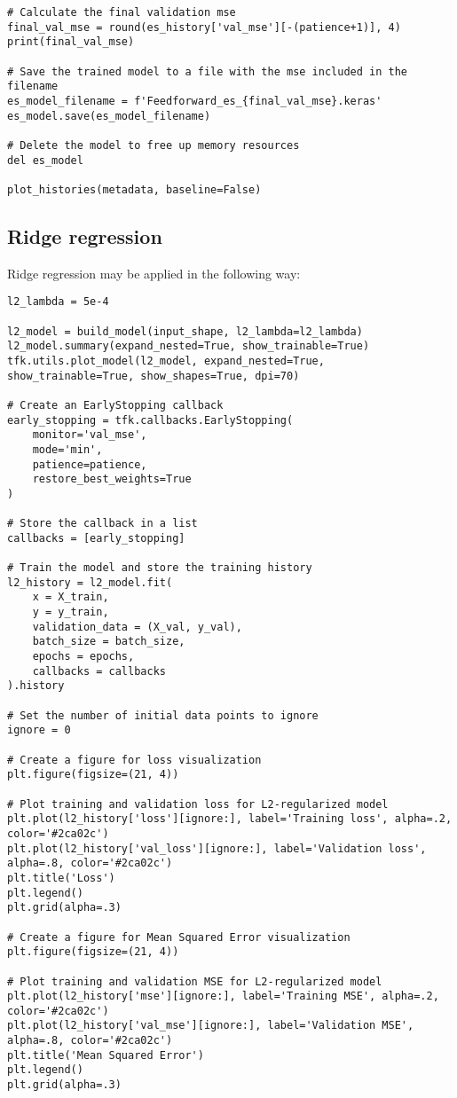 \begin{lstlisting}[style=Python]
# Calculate the final validation mse
final_val_mse = round(es_history['val_mse'][-(patience+1)], 4)
print(final_val_mse)

# Save the trained model to a file with the mse included in the filename
es_model_filename = f'Feedforward_es_{final_val_mse}.keras'
es_model.save(es_model_filename)

# Delete the model to free up memory resources
del es_model

plot_histories(metadata, baseline=False)
\end{lstlisting}

\subsection{Ridge regression}
Ridge regression may be applied in the following way: 
\begin{lstlisting}[style=Python]
l2_lambda = 5e-4

l2_model = build_model(input_shape, l2_lambda=l2_lambda)
l2_model.summary(expand_nested=True, show_trainable=True)
tfk.utils.plot_model(l2_model, expand_nested=True, show_trainable=True, show_shapes=True, dpi=70)

# Create an EarlyStopping callback
early_stopping = tfk.callbacks.EarlyStopping(
    monitor='val_mse',
    mode='min',
    patience=patience,
    restore_best_weights=True
)

# Store the callback in a list
callbacks = [early_stopping]

# Train the model and store the training history
l2_history = l2_model.fit(
    x = X_train,
    y = y_train,
    validation_data = (X_val, y_val),
    batch_size = batch_size,
    epochs = epochs,
    callbacks = callbacks
).history

# Set the number of initial data points to ignore
ignore = 0

# Create a figure for loss visualization
plt.figure(figsize=(21, 4))

# Plot training and validation loss for L2-regularized model
plt.plot(l2_history['loss'][ignore:], label='Training loss', alpha=.2, color='#2ca02c')
plt.plot(l2_history['val_loss'][ignore:], label='Validation loss', alpha=.8, color='#2ca02c')
plt.title('Loss')
plt.legend()
plt.grid(alpha=.3)

# Create a figure for Mean Squared Error visualization
plt.figure(figsize=(21, 4))

# Plot training and validation MSE for L2-regularized model
plt.plot(l2_history['mse'][ignore:], label='Training MSE', alpha=.2, color='#2ca02c')
plt.plot(l2_history['val_mse'][ignore:], label='Validation MSE', alpha=.8, color='#2ca02c')
plt.title('Mean Squared Error')
plt.legend()
plt.grid(alpha=.3)


\end{lstlisting}
